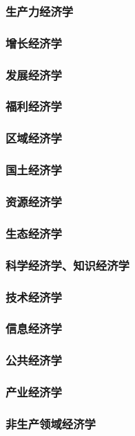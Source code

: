 \documentclass[UTF8]{../../RepresentationUniverse}
\begin{document}
    \subsubsection{生产力经济学}
    \subsubsection{增长经济学}
    \subsubsection{发展经济学}
    \subsubsection{福利经济学}
    \subsubsection{区域经济学}
    \subsubsection{国土经济学}
    \subsubsection{资源经济学}
    \subsubsection{生态经济学}
    \subsubsection{科学经济学、知识经济学}
    \subsubsection{技术经济学}
    \subsubsection{信息经济学}
    \subsubsection{公共经济学}
    \subsubsection{产业经济学}
    \subsubsection{非生产领域经济学}
\end{document}
